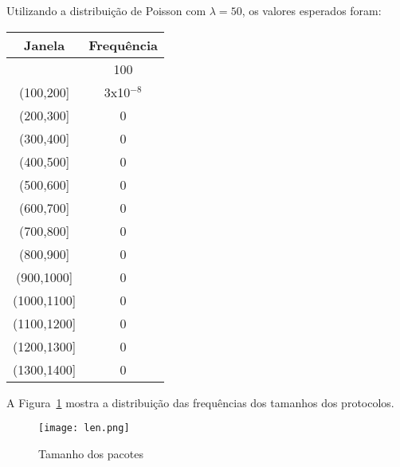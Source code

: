 \documentclass[11pt,a4paper]{book}
\begin{document}
\begin{enumerate}
\begin{itemize}
					Utilizando a distribuição de Poisson com $\lambda=50$, os valores esperados foram:
					\begin{tabular}{|c|c|}
						\hline
						Janela & Frequência\\
						\hline
						[0,100] & 100\\
						\hline
						(100,200] & 3x10$^{-8}$\\
						\hline
						(200,300] & 0\\
						\hline
						(300,400] & 0\\
						\hline
						(400,500] & 0\\
						\hline
						(500,600] & 0\\
						\hline
						(600,700] & 0\\
						\hline
						(700,800] & 0\\
						\hline
						(800,900] & 0\\
						\hline
						(900,1000] & 0\\
						\hline
						(1000,1100] & 0\\
						\hline
						(1100,1200] & 0\\
						\hline
						(1200,1300] & 0\\
						\hline
						(1300,1400] & 0\\
						\hline
					\end{tabular}

					A Figura~\ref{fig:fig2} mostra a distribuição das frequências dos tamanhos dos protocolos.
					
					\begin{figure}[t]
						\centering
						\texttt{[image: len.png]}
						\label{fig:fig2}
						\caption{Tamanho dos pacotes}
					\end{figure}					
					

\end{itemize}
\end{enumerate}
\end{document}
